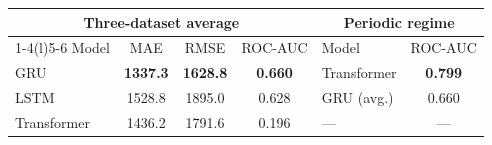 \begin{tabular}{lccc@{\hskip 2.4em}lc}
  \toprule
  \multicolumn{4}{c}{Three-dataset average} & \multicolumn{2}{c}{Periodic regime} \\
  \cmidrule(r){1-4}\cmidrule(l){5-6}
  Model & MAE & RMSE & ROC-AUC & Model & ROC-AUC \\
  \midrule
  GRU         & \textbf{1337.3} & \textbf{1628.8} & \textbf{0.660} & Transformer & \textbf{0.799} \\
  LSTM        & 1528.8 & 1895.0 & 0.628 & GRU (avg.)   & 0.660 \\
  Transformer & 1436.2 & 1791.6 & 0.196 & ---          & ---   \\
  \bottomrule
\end{tabular}
